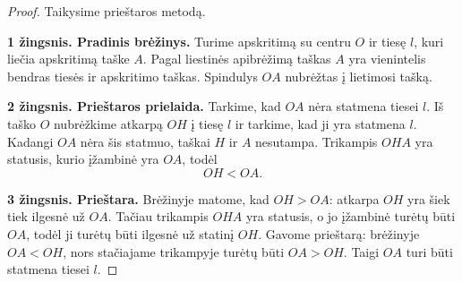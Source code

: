 \documentclass[11pt,a4paper]{scrartcl}
\begin{document}
\begin{proof}
Taikysime prieštaros metodą.

\textbf{1 žingsnis. Pradinis brėžinys.} Turime apskritimą su centru $O$ ir tiesę $l$, kuri liečia apskritimą taške $A$. Pagal liestinės apibrėžimą taškas $A$ yra vienintelis bendras tiesės ir apskritimo taškas. Spindulys $OA$ nubrėžtas į lietimosi tašką.

\begin{center}
\end{center}

\textbf{2 žingsnis. Prieštaros prielaida.} Tarkime, kad $OA$ nėra statmena tiesei $l$. Iš taško $O$ nubrėžkime atkarpą $OH$ į tiesę $l$ ir tarkime, kad ji yra statmena $l$. Kadangi $OA$ nėra šis statmuo, taškai $H$ ir $A$ nesutampa. Trikampis $OHA$ yra statusis, kurio įžambinė yra $OA$, todėl
\[
OH<OA.
\]

\begin{center}
\end{center}

\textbf{3 žingsnis. Prieštara.} Brėžinyje matome, kad $OH>OA$: atkarpa $OH$ yra šiek tiek ilgesnė už $OA$. Tačiau trikampis $OHA$ yra statusis, o jo įžambinė turėtų būti $OA$, todėl ji turėtų būti ilgesnė už statinį $OH$. Gavome prieštarą: brėžinyje $OA<OH$, nors stačiajame trikampyje turėtų būti $OA>OH$.
Taigi $OA$ turi būti statmena tiesei $l$.
\end{proof}
\end{document}
